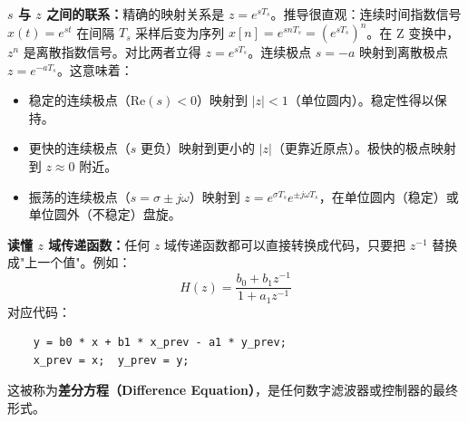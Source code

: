\textbf{$s$ 与 $z$ 之间的联系：}精确的映射关系是 $z = e^{sT_s}$。推导很直观：连续时间指数信号 $x(t) = e^{st}$ 在间隔 $T_s$ 采样后变为序列 $x[n] = e^{snT_s} = (e^{sT_s})^n$。在 Z 变换中，$z^n$ 是离散指数信号。对比两者立得 $z = e^{sT_s}$。连续极点 $s = -a$ 映射到离散极点 $z = e^{-aT_s}$。这意味着：
\begin{itemize}
    \item 稳定的连续极点（$\text{Re}(s) < 0$）映射到 $|z| < 1$（单位圆内）。稳定性得以保持。
    \item 更快的连续极点（$s$ 更负）映射到更小的 $|z|$（更靠近原点）。极快的极点映射到 $z \approx 0$ 附近。
    \item 振荡的连续极点（$s = \sigma \pm j\omega$）映射到 $z = e^{\sigma T_s} e^{\pm j\omega T_s}$，在单位圆内（稳定）或单位圆外（不稳定）盘旋。
\end{itemize}

\textbf{读懂 $z$ 域传递函数：}任何 $z$ 域传递函数都可以直接转换成代码，只要把 $z^{-1}$ 替换成"上一个值"。例如：
\[
H(z) = \frac{b_0 + b_1 z^{-1}}{1 + a_1 z^{-1}}
\]
对应代码：
\begin{verbatim}
    y = b0 * x + b1 * x_prev - a1 * y_prev;
    x_prev = x;  y_prev = y;
\end{verbatim}
这被称为\textbf{差分方程（Difference Equation）}，是任何数字滤波器或控制器的最终形式。
